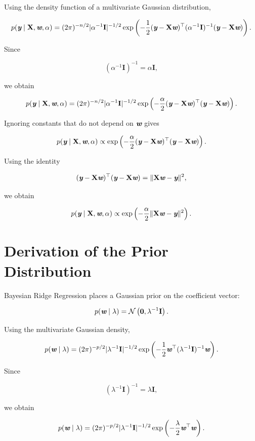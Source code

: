 \documentclass[14pt]{extarticle}
\def\mathbi#1{\textbf{\em #1}}
\begin{document}
Using the density function of a multivariate Gaussian distribution,

\[
p(\mathbi{y}\mid\mathbf{X},\mathbi{w},\alpha)
=
(2\pi)^{-n/2}
|\alpha^{-1}\mathbf{I}|^{-1/2}
\exp
\left(
-\frac12
(\mathbi{y}-\mathbf{X}\mathbi{w})^\top
(\alpha^{-1}\mathbf{I})^{-1}
(\mathbi{y}-\mathbf{X}\mathbi{w})
\right).
\]

Since

\[
(\alpha^{-1}\mathbf{I})^{-1}
=
\alpha\mathbf{I},
\]

we obtain

\[
p(\mathbi{y}\mid\mathbf{X},\mathbi{w},\alpha)
=
(2\pi)^{-n/2}
|\alpha^{-1}\mathbf{I}|^{-1/2}
\exp
\left(
-\frac{\alpha}{2}
(\mathbi{y}-\mathbf{X}\mathbi{w})^\top
(\mathbi{y}-\mathbf{X}\mathbi{w})
\right).
\]

Ignoring constants that do not depend on $\mathbi{w}$ gives

\[
p(\mathbi{y}\mid\mathbf{X},\mathbi{w},\alpha)
\propto
\exp
\left(
-\frac{\alpha}{2}
(\mathbi{y}-\mathbf{X}\mathbi{w})^\top
(\mathbi{y}-\mathbf{X}\mathbi{w})
\right).
\]

Using the identity

\[
(\mathbi{y}-\mathbf{X}\mathbi{w})^\top
(\mathbi{y}-\mathbf{X}\mathbi{w})
=
\|\mathbf{X}\mathbi{w}-\mathbi{y}\|^2,
\]

we obtain

\[
p(\mathbi{y}\mid\mathbf{X},\mathbi{w},\alpha)
\propto
\exp
\left(
-\frac{\alpha}{2}
\|\mathbf{X}\mathbi{w}-\mathbi{y}\|^2
\right).
\]

\section*{Derivation of the Prior Distribution}

Bayesian Ridge Regression places a Gaussian prior on the coefficient vector:

\[
p(\mathbi{w}\mid\lambda)
=
\mathcal{N}
\left(
\mathbf{0},
\lambda^{-1}\mathbf{I}
\right).
\]

Using the multivariate Gaussian density,

\[
p(\mathbi{w}\mid\lambda)
=
(2\pi)^{-p/2}
|\lambda^{-1}\mathbf{I}|^{-1/2}
\exp
\left(
-\frac12
\mathbi{w}^\top
(\lambda^{-1}\mathbf{I})^{-1}
\mathbi{w}
\right).
\]

Since

\[
(\lambda^{-1}\mathbf{I})^{-1}
=
\lambda\mathbf{I},
\]

we obtain

\[
p(\mathbi{w}\mid\lambda)
=
(2\pi)^{-p/2}
|\lambda^{-1}\mathbf{I}|^{-1/2}
\exp
\left(
-\frac{\lambda}{2}
\mathbi{w}^\top\mathbi{w}
\right).
\]
\end{document}

